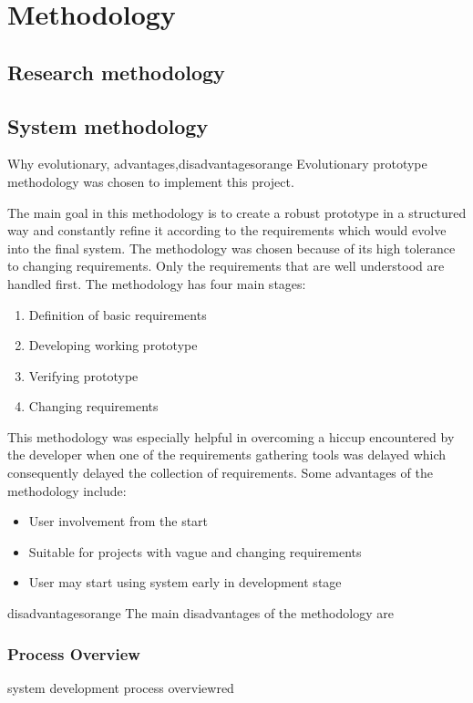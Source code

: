 \chapter{Methodology}
\section{Research methodology}

\section{System methodology}
\begin{review_comment}{Why evolutionary, advantages,disadvantages}{orange}
{Evolutionary prototype methodology was chosen to implement this project.
}\end{review_comment}
The main goal in this methodology is to create a robust prototype in a structured way and constantly refine it according to the requirements which would evolve into the final system. The methodology was chosen because of its high tolerance to changing requirements. Only the
requirements that are well understood are handled first.
The methodology has four main stages:
\begin{enumerate}
\item Definition of basic requirements
\item Developing working prototype
\item Verifying prototype
\item Changing requirements
\end{enumerate}

This methodology was especially helpful in overcoming a hiccup encountered by the developer when one of the requirements gathering tools was delayed which consequently delayed the collection of
requirements.
Some advantages of the methodology include:
\begin{itemize}
\item User involvement from the start
\item Suitable for projects with vague and changing requirements
\item User may start using system early in development stage
\end{itemize}

\begin{review_comment}{disadvantages}{orange}
{The main disadvantages of the methodology are}
\end{review_comment}

\subsection{Process Overview}
\begin{review_comment}{system development process overview}{red}{}
\end{review_comment}

